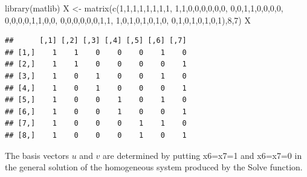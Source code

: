\documentclass[
]{book}
\newenvironment{Shaded}{\begin{snugshade}}{\end{snugshade}}
\newcommand{\DecValTok}[1]{\textcolor[rgb]{0.00,0.00,0.81}{#1}}
\newcommand{\FunctionTok}[1]{\textcolor[rgb]{0.00,0.00,0.00}{#1}}
\newcommand{\NormalTok}[1]{#1}
\newcommand{\OtherTok}[1]{\textcolor[rgb]{0.56,0.35,0.01}{#1}}
\begin{document}
\begin{Shaded}
\begin{Highlighting}[]
\FunctionTok{library}\NormalTok{(matlib)}
\NormalTok{X }\OtherTok{\textless{}{-}} \FunctionTok{matrix}\NormalTok{(}\FunctionTok{c}\NormalTok{(}\DecValTok{1}\NormalTok{,}\DecValTok{1}\NormalTok{,}\DecValTok{1}\NormalTok{,}\DecValTok{1}\NormalTok{,}\DecValTok{1}\NormalTok{,}\DecValTok{1}\NormalTok{,}\DecValTok{1}\NormalTok{,}\DecValTok{1}\NormalTok{,}
          \DecValTok{1}\NormalTok{,}\DecValTok{1}\NormalTok{,}\DecValTok{0}\NormalTok{,}\DecValTok{0}\NormalTok{,}\DecValTok{0}\NormalTok{,}\DecValTok{0}\NormalTok{,}\DecValTok{0}\NormalTok{,}\DecValTok{0}\NormalTok{,}
          \DecValTok{0}\NormalTok{,}\DecValTok{0}\NormalTok{,}\DecValTok{1}\NormalTok{,}\DecValTok{1}\NormalTok{,}\DecValTok{0}\NormalTok{,}\DecValTok{0}\NormalTok{,}\DecValTok{0}\NormalTok{,}\DecValTok{0}\NormalTok{,}
          \DecValTok{0}\NormalTok{,}\DecValTok{0}\NormalTok{,}\DecValTok{0}\NormalTok{,}\DecValTok{0}\NormalTok{,}\DecValTok{1}\NormalTok{,}\DecValTok{1}\NormalTok{,}\DecValTok{0}\NormalTok{,}\DecValTok{0}\NormalTok{,}
          \DecValTok{0}\NormalTok{,}\DecValTok{0}\NormalTok{,}\DecValTok{0}\NormalTok{,}\DecValTok{0}\NormalTok{,}\DecValTok{0}\NormalTok{,}\DecValTok{0}\NormalTok{,}\DecValTok{1}\NormalTok{,}\DecValTok{1}\NormalTok{,}
          \DecValTok{1}\NormalTok{,}\DecValTok{0}\NormalTok{,}\DecValTok{1}\NormalTok{,}\DecValTok{0}\NormalTok{,}\DecValTok{1}\NormalTok{,}\DecValTok{0}\NormalTok{,}\DecValTok{1}\NormalTok{,}\DecValTok{0}\NormalTok{,}
          \DecValTok{0}\NormalTok{,}\DecValTok{1}\NormalTok{,}\DecValTok{0}\NormalTok{,}\DecValTok{1}\NormalTok{,}\DecValTok{0}\NormalTok{,}\DecValTok{1}\NormalTok{,}\DecValTok{0}\NormalTok{,}\DecValTok{1}\NormalTok{),}\DecValTok{8}\NormalTok{,}\DecValTok{7}\NormalTok{)}
\NormalTok{X}
\end{Highlighting}
\end{Shaded}

\begin{verbatim}
##      [,1] [,2] [,3] [,4] [,5] [,6] [,7]
## [1,]    1    1    0    0    0    1    0
## [2,]    1    1    0    0    0    0    1
## [3,]    1    0    1    0    0    1    0
## [4,]    1    0    1    0    0    0    1
## [5,]    1    0    0    1    0    1    0
## [6,]    1    0    0    1    0    0    1
## [7,]    1    0    0    0    1    1    0
## [8,]    1    0    0    0    1    0    1
\end{verbatim}

The basis vectors \(u\) and \(v\) are determined by putting x6=x7=1 and x6=x7=0 in the general solution of the homogeneous system produced by the Solve function.
\end{document}
